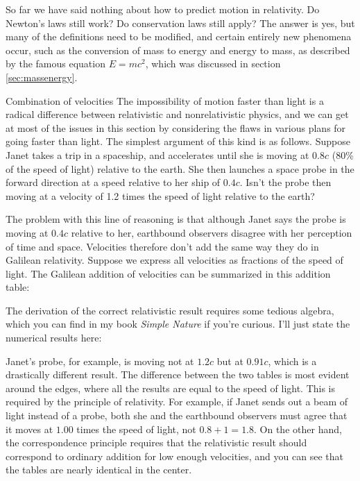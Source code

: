 \label{sec:reldynamics}
So far we have said nothing about how to predict motion in
relativity. Do Newton's laws still work? Do conservation
laws still apply? The answer is yes, but many of the
definitions need to be modified, and certain entirely new
phenomena occur, such as the conversion of mass to energy
and energy to mass, as described by the famous equation
$E=mc^2$, which was discussed in section \ref{sec:massenergy}.
%
\begin{envsubsection}{Combination of velocities}
The impossibility of motion faster than light is a
 radical difference between relativistic and
nonrelativistic physics, and we can get at most of the
issues in this section by considering the flaws in various
plans for going faster than light. The simplest argument of
this kind is as follows. Suppose Janet takes a trip in a
spaceship, and accelerates until she is moving at $0.8c$ (80\%
of the speed of light) relative to the
earth. She then launches a space probe in the forward
direction at a speed relative to her ship of $0.4c$. Isn't the
probe then moving at a velocity of 1.2 times the speed of
light relative to the earth?

The problem with this line of reasoning is that although Janet
says the probe is moving at $0.4c$ relative to her, earthbound
observers disagree with her perception of time and space.
Velocities therefore don't add the same way they do in Galilean
relativity. Suppose we express all velocities as fractions of the
speed of light. The Galilean addition of velocities can be
summarized in this addition table:


\noindent The derivation of the correct relativistic result requires some tedious algebra,
which you can find in my book \emph{Simple Nature} if
you're curious. I'll just state the numerical results here:


Janet's probe, for example, is moving not at $1.2c$ but at $0.91c$, which is
a drastically different result. The difference between the two tables is most evident
around the edges, where all the results are equal to the speed
of light. This is required by the principle of relativity. For example, if Janet sends
out a beam of light instead of a probe, both she and the earthbound observers must
agree that it moves at $1.00$ times the speed of light, not $0.8+1=1.8$.
On the other hand, the correspondence principle requires that the relativistic
result should correspond to ordinary addition for low enough velocities,
and you can see that the tables are nearly identical in the
center.

\end{envsubsection}
